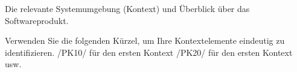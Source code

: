 %                                                                              
%                                                                              

Die relevante Systemumgebung (Kontext) und Überblick über das Softwareprodukt.

Verwenden Sie die folgenden Kürzel, um Ihre Kontextelemente eindeutig zu identifizieren.
/PK10/ für den ersten Kontext
/PK20/ für den ersten Kontext
usw.
